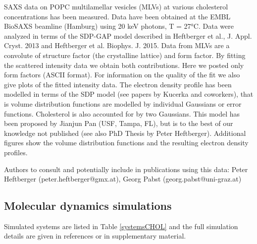 \documentclass[aps,prl,superscriptaddress,twocolumn]{revtex4}
\begin{document}
SAXS data on POPC multilamellar vesicles (MLVs) at various cholesterol concentrations
has been measured. Data have been obtained at the EMBL BioSAXS beamline (Hamburg) using 20 keV photons, T = 27°C. Data were analyzed in terms of the SDP-GAP model described in Heftberger et al., J. Appl. Cryst. 2013 and Heftberger et al. Biophys. J. 2015. Data from MLVs are a convolute of structure factor (the crystalline lattice) and form factor. By fitting the scattered intensity data we obtain both contributions. Here we posted only form factors (ASCII format). For information on the quality of the fit we also give plots of the fitted intensity data. The electron density profile has been modelled in terms of the SDP model (see papers by Kucerka and coworkers), that is volume distribution functions are modelled by individual Gaussians or error functions. Cholesterol is also accounted for by two Gaussians. This model has been proposed by Jianjun Pan (USF, Tampa, FL), but is to the best of our knowledge not published (see also PhD Thesis by Peter Heftberger). Additional figures show the volume distribution functions and the resulting electron density profiles.

Authors to consult and potentially include in publications using this data: Peter Heftberger (peter.heftberger@gmx.at), Georg Pabst (georg.pabst@uni-graz.at)

\subsection{Molecular dynamics simulations}

Simulated systems are listed in Table \ref{systemsCHOL} and the full simulation
details are given in references or in supplementary material.
\end{document}
